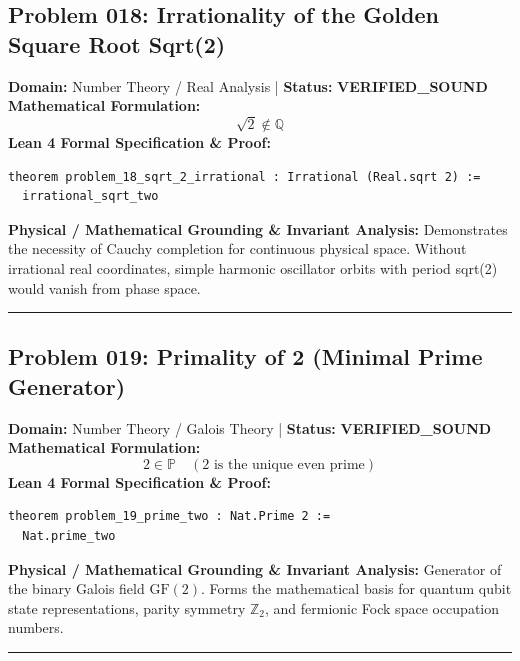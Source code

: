 \documentclass[10pt,a4paper]{article}
\begin{document}
\subsection*{Problem 018: Irrationality of the Golden Square Root Sqrt(2)}
\textbf{Domain:} Number Theory / Real Analysis \quad | \quad \textbf{Status:} \textcolor{green!70!black}{\textbf{VERIFIED\_SOUND}}\\
\textbf{Mathematical Formulation:}
\begin{equation*}
  \sqrt{2} \notin \mathbb{Q}
\end{equation*}
\textbf{Lean 4 Formal Specification \& Proof:}
\begin{lstlisting}
theorem problem_18_sqrt_2_irrational : Irrational (Real.sqrt 2) :=
  irrational_sqrt_two
\end{lstlisting}
\textbf{Physical / Mathematical Grounding \& Invariant Analysis:}
Demonstrates the necessity of Cauchy completion for continuous physical space. Without irrational real coordinates, simple harmonic oscillator orbits with period sqrt(2) would vanish from phase space.
\vspace{0.8em}\hrule\vspace{0.8em}
\subsection*{Problem 019: Primality of 2 (Minimal Prime Generator)}
\textbf{Domain:} Number Theory / Galois Theory \quad | \quad \textbf{Status:} \textcolor{green!70!black}{\textbf{VERIFIED\_SOUND}}\\
\textbf{Mathematical Formulation:}
\begin{equation*}
  2 \in \mathbb{P} \quad (2 \text{ is the unique even prime})
\end{equation*}
\textbf{Lean 4 Formal Specification \& Proof:}
\begin{lstlisting}
theorem problem_19_prime_two : Nat.Prime 2 :=
  Nat.prime_two
\end{lstlisting}
\textbf{Physical / Mathematical Grounding \& Invariant Analysis:}
Generator of the binary Galois field $\mathrm{GF}(2)$. Forms the mathematical basis for quantum qubit state representations, parity symmetry $\mathbb{Z}_2$, and fermionic Fock space occupation numbers.
\vspace{0.8em}\hrule\vspace{0.8em}
\end{document}
